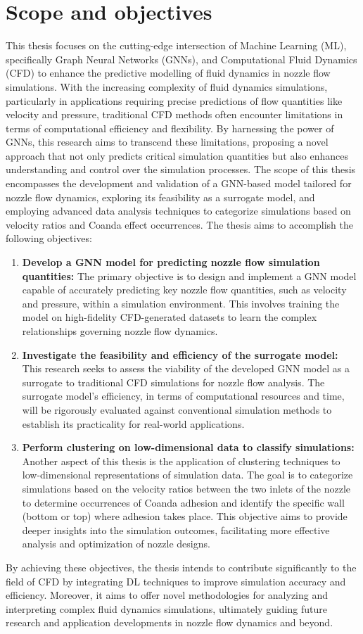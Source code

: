 \section{Scope and objectives}
This thesis focuses on the cutting-edge intersection of Machine Learning (ML), specifically Graph Neural Networks (GNNs), and Computational Fluid Dynamics (CFD) to enhance the predictive modelling of fluid dynamics in nozzle flow simulations. With the increasing complexity of fluid dynamics simulations, particularly in applications requiring precise predictions of flow quantities like velocity and pressure, traditional CFD methods often encounter limitations in terms of computational efficiency and flexibility. By harnessing the power of GNNs, this research aims to transcend these limitations, proposing a novel approach that not only predicts critical simulation quantities but also enhances understanding and control over the simulation processes. The scope of this thesis encompasses the development and validation of a GNN-based model tailored for nozzle flow dynamics, exploring its feasibility as a surrogate model, and employing advanced data analysis techniques to categorize simulations based on velocity ratios and Coanda effect occurrences. The thesis aims to accomplish the following objectives: 
\begin{enumerate}
\item \textbf{Develop a GNN model for predicting nozzle flow simulation quantities:} The primary objective is to design and implement a GNN model capable of accurately predicting key nozzle flow quantities, such as velocity and pressure, within a simulation environment. This involves training the model on high-fidelity CFD-generated datasets to learn the complex relationships governing nozzle flow dynamics.
\item \textbf{Investigate the feasibility and efficiency of the surrogate model:} This research seeks to assess the viability of the developed GNN model as a surrogate to traditional CFD simulations for nozzle flow analysis. The surrogate model's efficiency, in terms of computational resources and time, will be rigorously evaluated against conventional simulation methods to establish its practicality for real-world applications.
\item \textbf{Perform clustering on low-dimensional data to classify simulations:} Another aspect of this thesis is the application of clustering techniques to low-dimensional representations of simulation data. The goal is to categorize simulations based on the velocity ratios between the two inlets of the nozzle to determine occurrences of Coanda adhesion and identify the specific wall (bottom or top) where adhesion takes place. This objective aims to provide deeper insights into the simulation outcomes, facilitating more effective analysis and optimization of nozzle designs.
\end{enumerate}
By achieving these objectives, the thesis intends to contribute significantly to the field of CFD by integrating DL techniques to improve simulation accuracy and efficiency. Moreover, it aims to offer novel methodologies for analyzing and interpreting complex fluid dynamics simulations, ultimately guiding future research and application developments in nozzle flow dynamics and beyond.